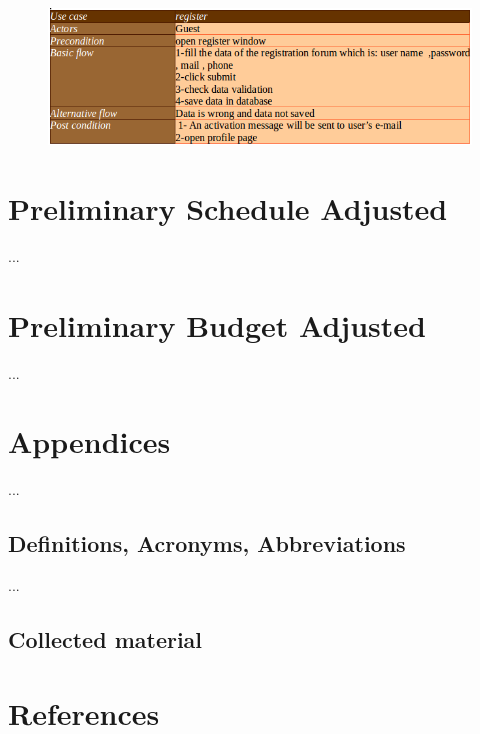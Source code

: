 \documentclass[]{article}
\begin{document}
\begin{figure}[H]
\centering
\includegraphics[scale=0.4]{./scenario/01}
\end{figure}


\section{Preliminary Schedule Adjusted}
... 
\section{Preliminary Budget Adjusted}
... 
\section{Appendices}
... 
\subsection{Definitions, Acronyms, Abbreviations}
... 
\subsection{Collected material}

\section {References}



\end{document}
